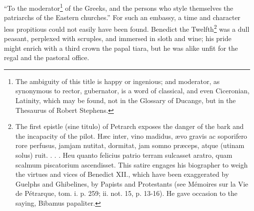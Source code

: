 \texthebrew{“}To the moderator\footnote{The ambiguity of this title is happy or ingenious; and moderator, as synonymous to rector, gubernator, is a word of classical, and even Ciceronian, Latinity, which may be found, not in the Glossary of Ducange, but in the Thesaurus of Robert Stephens.} of the Greeks, and the persons who style themselves the patriarchs of the Eastern churches.\texthebrew{}” For such an embassy, a time and character less propitious could not easily have been found. Benedict the Twelfth\footnote{The first epistle (sine titulo) of Petrarch exposes the danger of the bark and the incapacity of the pilot. Hæc inter, vino madidus, ævo gravis ac soporifero rore perfusus, jamjam nutitat, dormitat, jam somno præceps, atque (utinam solus) ruit. . . . Heu quanto felicius patrio terram sulcasset aratro, quam scalmum piscatorium ascendisset. This satire engages his biographer to weigh the virtues and vices of Benedict XII., which have been exaggerated by Guelphs and Ghibelines, by Papists and Protestants (see Mémoires sur la Vie de Pétrarque, tom. i. p. 259; ii. not. 15, p. 13-16). He gave occasion to the saying, Bibamus papaliter.} was a dull peasant, perplexed with scruples, and immersed in sloth and wine; his pride might enrich with a third crown the papal tiara, but he was alike unfit for the regal and the pastoral office.

